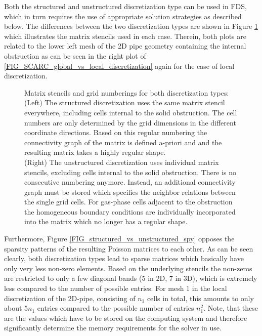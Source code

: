 Both the structured and unstructured discretization type can be used in FDS, which in turn requires the use of appropriate solution strategies as described below.
The differences between the two discretization types are shown in Figure \ref{FIG_SCARC_structured_vs_unstructured_discretization} which illustrates the matrix stencils used in each case. Therein, both plots are related to
the lower left mesh of the 2D pipe geometry containing the internal obstruction as can be seen in the right plot of \ref{FIG_SCARC_global_vs_local_discretization} again for the case of local discretization.

\begin{figure}[ht]
\begin{center}
\begin{minipage}[b]{0.475\textwidth}
\centering
\end{minipage}
\hspace{5mm}
\begin{minipage}[b]{0.475\textwidth}
\centering
\end{minipage}
\end{center}
\caption[Structured versus unstructured discretization]{Matrix stencils and grid numberings for both discretization types: \\ 
(Left) The structured discretization uses the same matrix stencil everywhere, including cells internal to the solid obstruction. The cell numbers are only determined by the grid dimensions in the different coordinate directions. Based on this regular numbering the connectivity graph of the matrix is defined a-priori and and the resulting matrix takes a highly regular shape. \\
(Right) The unstructured discretization uses individual matrix stencils, excluding cells internal to the solid obstruction. There is no consecutive numbering anymore. Instead, an additional connectivity graph must be stored which specifies the neighbor relations between the single grid cells. For gas-phase cells adjacent to the obstruction the homogeneous boundary conditions are individually incorporated into the matrix which no longer has a regular shape.}
\label{FIG_SCARC_structured_vs_unstructured_discretization}
\end{figure}

Furthermore, Figure \ref{FIG_structured_vs_unstructured_spy} opposes the sparsity patterns of the resulting Poisson matrices to each other.
As can be seen clearly, both discretization types lead to sparse matrices which basically have only very less non-zero elements. 
Based on the underlying stencils the non-zeros are restricted to only a few diagonal bands (5 in 2D, 7 in 3D),
which is extremely less compared to the number of possible entries.
%
For mesh 1 in the local discretization of the 2D-pipe, consisting of $n_1$ cells in total, this amounts to only about $5 n_1$ entries compared to the possible number of entries $n_1^2$. 
%
Note, that these are the values which have to be stored on the computing system and therefore significantly determine the memory requirements for the solver in use.


